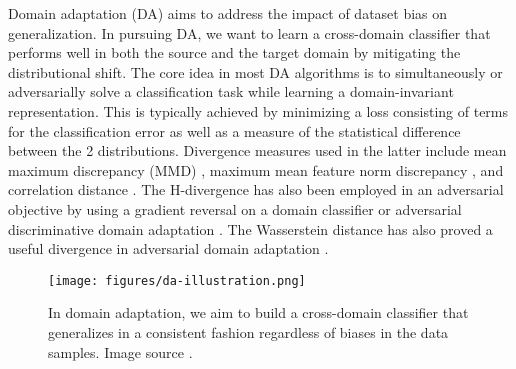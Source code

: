 \documentclass{article}
\begin{document}

Domain adaptation (DA) aims to address the impact of dataset bias on generalization. In pursuing DA, we want to learn a cross-domain classifier that performs well in both the source and the target domain by mitigating the distributional shift. The core idea in most DA algorithms is to simultaneously or adversarially solve a classification task while learning a domain-invariant representation. This is typically achieved by minimizing a loss consisting of terms for the classification error as well as a measure of the statistical difference between the 2 distributions. Divergence measures used in the latter include mean maximum discrepancy (MMD) \cite{tzeng2014deep},  maximum mean feature norm discrepancy \cite{xu2019larger}, and correlation distance \cite{sun2016deep, sun2016return}. The H-divergence has also been employed in an adversarial objective by using a gradient reversal on a domain classifier \cite{ganin2016domain} or adversarial discriminative domain adaptation \cite{tzeng2017adversarial}. The Wasserstein distance has also proved a useful divergence in adversarial domain adaptation \cite{shen2018wasserstein}. %

\begin{figure}[b!]
\begin{minipage}[b]{0.45\textwidth}
  \centering
  \centerline{\texttt{[image: figures/da-illustration.png]}}
\end{minipage}
\caption{In domain adaptation, we aim to build a cross-domain classifier that generalizes in a consistent fashion regardless of biases in the data samples. Image source \cite{shi2022deep}.}
\label{da-illustration}
%
\end{figure}
\end{document}
